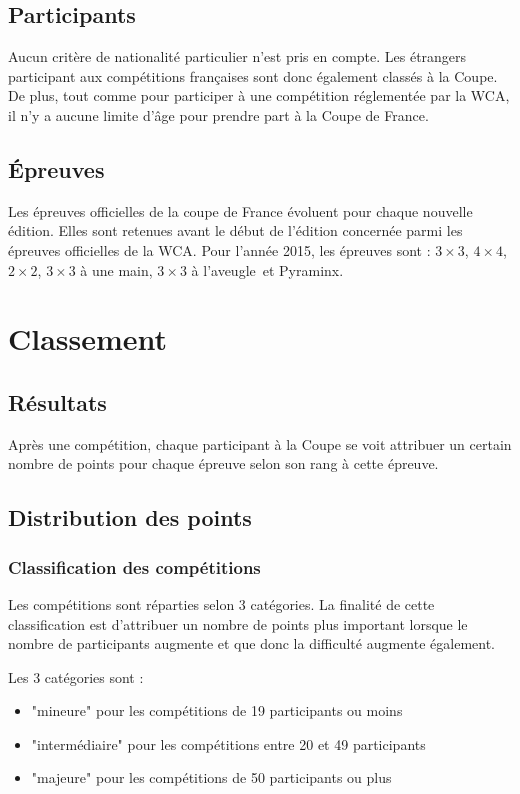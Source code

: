 \documentclass[10pt,a4paper]{article}
\newcommand{\3}{$3\times3$}
\newcommand{\4}{$4\times4$}
\newcommand{\2}{$2\times2$}
\newcommand{\oh}{$3\times3$ à une main}
\newcommand{\bld}{$3\times3$ à l'aveugle}
\newcommand{\pyra}{Pyraminx}
\begin{document}
\subsection{Participants}

Aucun critère de nationalité particulier n'est pris en compte. Les étrangers participant aux compétitions françaises sont donc également classés à la Coupe. De plus, tout comme pour participer à une compétition réglementée par la WCA, il n'y a aucune limite d'âge pour prendre part à la Coupe de France.

\subsection{Épreuves}

Les épreuves officielles de la coupe de France évoluent pour chaque nouvelle édition. Elles sont retenues avant le début de l'édition concernée parmi les épreuves officielles de la WCA. Pour l'année 2015, les épreuves sont : \3, \4, \2, \oh, \bld\ et \pyra.

\pagebreak

\section{Classement}

\subsection{Résultats}

Après une compétition, chaque participant à la Coupe se voit attribuer un certain nombre de points pour chaque épreuve selon son rang à cette épreuve.

\subsection{Distribution des points}
\subsubsection{Classification des compétitions}

Les compétitions sont réparties selon 3 catégories. La finalité de cette classification est d'attribuer un nombre de points plus important lorsque le nombre de participants augmente et que donc la difficulté augmente également.

Les 3 catégories sont : 
\begin{itemize}
\item "mineure" pour les compétitions de 19 participants ou moins
\item "intermédiaire" pour les compétitions entre 20 et 49 participants
\item "majeure" pour les compétitions de 50 participants ou plus
\end{itemize}
\end{document}
